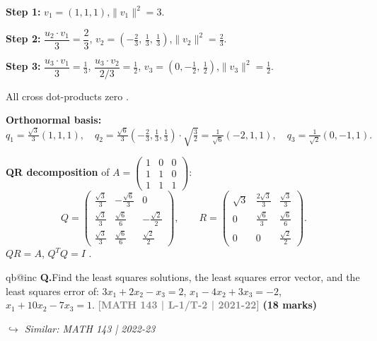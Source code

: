 \documentclass[12pt,a3paper]{article}
\makeatletter
\newcommand{\yr}[1]{\hfill\textcolor{gray}{\small\textbf{[#1]}}}
\newcommand{\mk}[1]{\textcolor{orange!70!black}{\small\textbf{(#1 marks)}}}
\newcommand{\variant}[1]{\par\vspace{1pt}\textcolor{blue!50!black}%
  {\footnotesize\textit{$\hookrightarrow$ Similar: #1}}}
\newcounter{qnum}
\newcommand{\Q}[1]{%
  \csname qb@inc\endcsname
  \needspace{4\baselineskip}
  \refstepcounter{qnum}
  \vspace{6pt}
  \noindent\textbf{Q\theqnum.}\enspace #1\par
}
\makeatother
\begin{document}
\begin{tcolorbox}[enhanced,breakable,
  colback=cD!4,colframe=cD,boxrule=0.8pt,arc=5pt,
  title={\textbf{Answer --- Gram-Schmidt $u_1=(1,1,1)$, $u_2=(0,1,1)$, $u_3=(0,0,1)$; QR Decomposition}},
  fonttitle=\bfseries\color{white},colbacktitle=cD]

\textbf{Step 1:} $v_1=(1,1,1)$,\quad $\|v_1\|^2=3$.

\textbf{Step 2:} $\dfrac{u_2\cdot v_1}{3}=\dfrac{2}{3}$,\quad
$v_2=\left(-\tfrac{2}{3},\,\tfrac{1}{3},\,\tfrac{1}{3}\right)$,\quad $\|v_2\|^2=\tfrac{2}{3}$.

\textbf{Step 3:} $\dfrac{u_3\cdot v_1}{3}=\tfrac{1}{3}$,\;
$\dfrac{u_3\cdot v_2}{2/3}=\tfrac{1}{2}$,\quad
$v_3=\left(0,-\tfrac{1}{2},\,\tfrac{1}{2}\right)$,\quad $\|v_3\|^2=\tfrac{1}{2}$.

All cross dot-products zero . \checkmark

\textbf{Orthonormal basis:}
\[
q_1=\tfrac{\sqrt{3}}{3}(1,1,1),\quad
q_2=\tfrac{\sqrt{6}}{3}\left(-\tfrac{2}{3},\tfrac{1}{3},\tfrac{1}{3}\right)\cdot\sqrt{\tfrac{3}{2}}
  =\tfrac{1}{\sqrt{6}}(-2,1,1),\quad
q_3=\tfrac{1}{\sqrt{2}}(0,-1,1).
\]

\textbf{QR decomposition} of $A=\begin{pmatrix}1&0&0\\1&1&0\\1&1&1\end{pmatrix}$:
\[
Q=\begin{pmatrix}
\frac{\sqrt{3}}{3}&-\frac{\sqrt{6}}{3}&0\\[4pt]
\frac{\sqrt{3}}{3}&\frac{\sqrt{6}}{6}&-\frac{\sqrt{2}}{2}\\[4pt]
\frac{\sqrt{3}}{3}&\frac{\sqrt{6}}{6}&\frac{\sqrt{2}}{2}
\end{pmatrix},\qquad
R=\begin{pmatrix}
\sqrt{3}&\frac{2\sqrt{3}}{3}&\frac{\sqrt{3}}{3}\\[4pt]
0&\frac{\sqrt{6}}{3}&\frac{\sqrt{6}}{6}\\[4pt]
0&0&\frac{\sqrt{2}}{2}
\end{pmatrix}.
\]
$QR=A$, $Q^TQ=I$ . \checkmark

\end{tcolorbox}

\Q{Find the least squares solutions, the least squares error vector, and the least squares error of:
$3x_1 + 2x_2 - x_3 = 2$, $x_1 - 4x_2 + 3x_3 = -2$, $x_1 + 10x_2 - 7x_3 = 1$.
\yr{MATH 143 | L-1/T-2 | 2021-22} \mk{18}
\variant{MATH 143 | 2022-23}}
\end{document}
